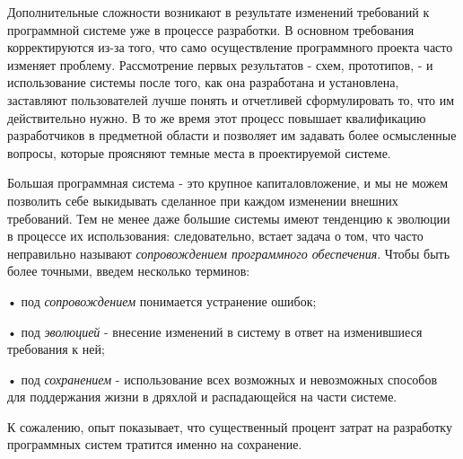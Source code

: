 \documentclass[a4paper,12pt]{article}
\newcommand\tab[1][1cm]{\hspace*{#1}}
\begin{document}
\begin{small}
Дополнительные сложности возникают в результате изменений требований к программной системе уже в процессе разработки. В основном требования корректируются из-за того, что само осуществление программного проекта часто изменяет проблему. Рассмотрение первых результатов - схем, прототипов, - и использование системы после того, как она разработана и установлена, заставляют пользователей лучше понять и отчетливей сформулировать то, что им действительно нужно. В то же время этот процесс повышает квалификацию разработчиков в предметной области и позволяет им задавать более осмысленные вопросы, которые проясняют темные места в проектируемой системе.\par \medskip
Большая программная система - это крупное капиталовложение, и мы не можем позволить себе выкидывать сделанное при каждом изменении внешних требований. Тем не менее даже большие системы имеют тенденцию к эволюции в процессе их использования: следовательно, встает задача о том, что часто неправильно называют \textit{сопровождением программного обеспечения}. Чтобы быть более точными, введем несколько терминов:\par
•	\tab под \textit{сопровождением} понимается устранение ошибок;\par
•	\tab под \textit{эволюцией} - внесение изменений в систему в ответ на изменившиеся требования к ней;\par
•	\tab под \textit{сохранением} - использование всех возможных и невозможных способов для поддержания жизни в дряхлой и распадающейся на части системе.\par \medskip
К сожалению, опыт показывает, что существенный процент затрат на разработку программных систем тратится именно на сохранение. \par \medskip

\end{small}
\end{document}
